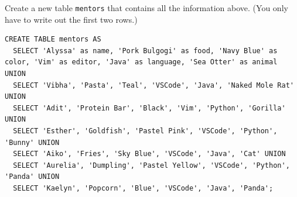 \begin{blocksection}
Create a new table \lstinline$mentors$ that contains all the information above.
(You only have to write out the first two rows.)

\begin{solution}[3in]
\begin{lstlisting}
CREATE TABLE mentors AS
  SELECT 'Alyssa' as name, 'Pork Bulgogi' as food, 'Navy Blue' as color, 'Vim' as editor, 'Java' as language, 'Sea Otter' as animal UNION
  SELECT 'Vibha', 'Pasta', 'Teal', 'VSCode', 'Java', 'Naked Mole Rat' UNION
  SELECT 'Adit', 'Protein Bar', 'Black', 'Vim', 'Python', 'Gorilla' UNION
  SELECT 'Esther', 'Goldfish', 'Pastel Pink', 'VSCode', 'Python', 'Bunny' UNION
  SELECT 'Aiko', 'Fries', 'Sky Blue', 'VSCode', 'Java', 'Cat' UNION
  SELECT 'Aurelia', 'Dumpling', 'Pastel Yellow', 'VSCode', 'Python', 'Panda' UNION
  SELECT 'Kaelyn', 'Popcorn', 'Blue', 'VSCode', 'Java', 'Panda';
\end{lstlisting}
\end{solution}
\end{blocksection}